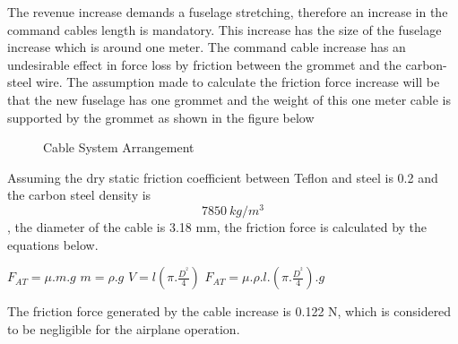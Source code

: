 The revenue increase demands a fuselage stretching, therefore an increase in the command cables length is mandatory. This increase has the size of the fuselage increase which is around one meter. The command cable increase has an undesirable effect in force loss by friction between the grommet and the carbon-steel wire. The assumption made to calculate the friction force increase will be that the new fuselage has one grommet and the weight of this one meter cable is supported by the grommet as shown in the figure below

\begin{figure}[H] %
\caption{Cable System Arrangement}
\label{fig:Sistema}
\end{figure}


Assuming the dry static friction coefficient between Teflon and steel is 0.2 and the carbon steel density is \[7850\ kg/m^{3}\], the diameter of the cable is 3.18 mm, the friction force is calculated by the equations below.

$F_{AT}=\mu .m.g$ %
$m=\rho .g$ %
$V=l\left ( \pi .\frac{D^{^{2}}}{4} \right )$
$F_{AT}=\mu .\rho .l.\left ( \pi .\frac{D^{^{2}}}{4} \right ).g$

The friction force generated by the cable increase is 0.122 N, which is considered to be negligible for the airplane operation.
